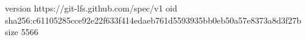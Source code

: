 version https://git-lfs.github.com/spec/v1
oid sha256:c61105285cce92e22f633f414edaeb761d5593935bb0eb50a57e8373a8d3f27b
size 5566
